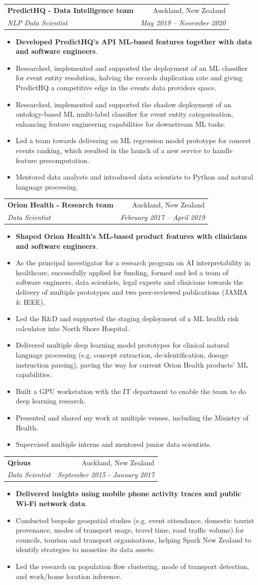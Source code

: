 \documentclass[letterpaper,11pt]{article}
\makeatletter
\newcommand{\resumeItemBis}[2]{
  \item\small{
    \textbf{#1}{#2 \vspace{-2pt}}
  }
}
\newcommand{\resumeSubheading}[4]{
  \vspace{-1pt}\item
    \begin{tabular*}{0.97\textwidth}[t]{l@{\extracolsep{\fill}}r}
      \textbf{#1} & #2 \\
      \textit{\small#3} & \textit{\small #4} \\
    \end{tabular*}\vspace{-5pt}
}
\newcommand{\resumeItemListStart}{\begin{itemize}}
\newcommand{\resumeItemListEnd}{\end{itemize}\vspace{-5pt}}
\makeatother
\begin{document}
	\resumeSubheading
      {PredictHQ - Data Intelligence team}{Auckland, New Zealand}
      {NLP Data Scientist}{May 2019 -- November 2020}
      \resumeItemListStart
        \resumeItemBis{Developed PredictHQ's API ML-based features together with data and software engineers}{.}
          \resumeItemBis{} {Researched, implemented and supported the deployment of an ML classifier for event entity resolution, halving the records duplication rate and giving PredictHQ a competitive edge in the events data providers space.}
          \resumeItemBis{} {Researched, implemented and supported the shadow deployment of an ontology-based ML multi-label classifier for event entity categorisation, enhancing feature engineering capabilities for downstream ML tasks.}
          \resumeItemBis{} {Led a team towards delivering an ML regression model prototype for concert events ranking, which resulted in the launch of a new service to handle feature precomputation.}
          \resumeItemBis{} {Mentored data analysts and introduced data scientists to Python and natural language processing.}
        \resumeItemListEnd	
	
    \resumeSubheading
      {Orion Health - Research team}{Auckland, New Zealand}
      {Data Scientist}{February 2017 -- April 2019}
      \resumeItemListStart
        \resumeItemBis{Shaped Orion Health’s ML-based product features with clinicians and software engineers}{.}
        \resumeItemBis{} {As the principal investigator for a research program on AI interpretability in healthcare, successfully applied for funding, formed and led a team of software engineers, data scientists, legal experts and clinicians towards the delivery of multiple prototypes and two peer-reviewed publications (JAMIA \& IEEE).}
        \resumeItemBis{} {Led the R\&D and supported the staging deployment of a ML health risk calculator into North Shore Hospital.}
        \resumeItemBis{} {Delivered multiple deep learning model prototypes for clinical natural language processing (e.g. concept extraction, de-identification, dosage instruction parsing), paving the way for current Orion Health products' ML capabilities.}
        \resumeItemBis{} {Built a GPU workstation with the IT department to enable the team to do deep learning research.}
        \resumeItemBis{} {Presented and shared my work at multiple venues, including the Ministry of Health.}
        \resumeItemBis{} {Supervised multiple interns and mentored junior data scientists.}
      \resumeItemListEnd

    \resumeSubheading
      {Qrious}{Auckland, New Zealand}
      {Data Scientist}{September 2015 - January 2017}
      \resumeItemListStart
        \resumeItemBis{Delivered insights using mobile phone activity traces and public Wi-Fi network data}{.}
        \resumeItemBis{} {Conducted bespoke geospatial studies (e.g. event attendance, domestic tourist provenance, modes of transport usage, travel time, road traffic volume) for councils, tourism and transport organisations, helping Spark New Zealand to identify strategies to monetise its data assets.}
        \resumeItemBis{} {Led the research on population flow clustering, mode of transport detection, and work/home location inference.}
      \resumeItemListEnd
\end{document}
